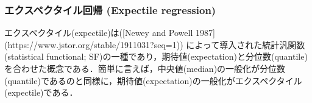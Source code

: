 \subsubsection{エクスペクタイル回帰 (Expectile regression)}エクスペクタイル(expectile)は([Newey and Powell 1987](https://www.jstor.org/stable/1911031?seq=1)) によって導入された統計汎関数 (statistical functional; SF)の一種であり，期待値(expectation)と分位数(quantile)を合わせた概念である．簡単に言えば，中央値(median)の一般化が分位数(quantile)であるのと同様に，期待値(expectation)の一般化がエクスペクタイル(expectile)である．